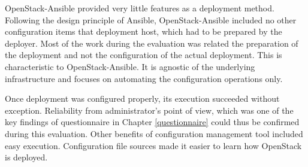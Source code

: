 \documentclass[officiallayout]{tktla}
\begin{document}
OpenStack-Ansible provided very little features as a deployment method.
Following the design principle of Ansible, OpenStack-Ansible included no other
configuration items that deployment host, which had to be prepared by the
deployer. Most of the work during the evaluation was related the preparation of
the deployment and not the configuration of the actual deployment. This is
characteristic to OpenStack-Ansible. It is agnostic of the underlying
infrastructure and focuses on automating the configuration operations only.

Once deployment was configured properly, its execution succeeded without
exception. Reliability from administrator's point of view, which was one of the
key findings of questionnaire in Chapter \ref{questionnaire} could thus be
confirmed during this evaluation. Other benefits of configuration management
tool included easy execution. Configuration file sources made it easier to
learn how OpenStack is deployed.
\end{document}
